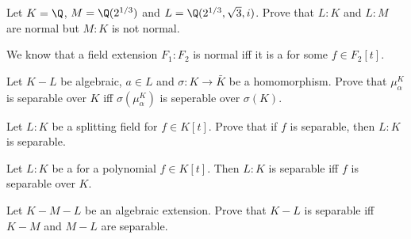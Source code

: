 \documentclass{article}
\begin{document}
\setcounter{section}{7} %
\begin{exercise}
Let $ K = \Q $, $ M = \Q(2^{1/3}) $ and $ L = \Q(2^{1/3}, \sqrt 3, i) $.
Prove that $ L:K $ and $ L:M $ are normal but $ M:K $ is not normal.
\end{exercise}
\begin{solution}
We know that a field extension $ F_1:F_2 $ is normal iff it is a \sfe for some $ f\in F_2[t] $.

\end{solution}

\begin{subexercise}
  Let $ K-L $ be algebraic, $ a\in L $ and $ \sigma:K\to \bar K $ be a homomorphism.
  Prove that $ \mu_\alpha^K $ is separable over $ K $ iff $ \sigma(\mu_\alpha^K) $ is seperable over $ \sigma(K) $.
\end{subexercise}
\begin{solution}

\end{solution}

\begin{subexercise}
  Let $ L:K $ be a splitting field for $ f\in K[t] $.
  Prove that if $ f $ is separable, then $ L:K $ is separable.
\end{subexercise}
\begin{solution}

\end{solution}

\begin{exercise}
  Let $ L:K $ be a \sfe for a polynomial $ f\in K[t] $.
  Then $ L:K $ is separable iff $ f $ is separable over $ K $.
\end{exercise}
\begin{solution}

\end{solution}

\begin{exercise}
  Let $ K-M-L $ be an algebraic extension.
  Prove that $ K-L $ is separable iff $ K-M $ and $ M-L $ are separable.
\end{exercise}
\begin{solution}

\end{solution}
\end{document}
